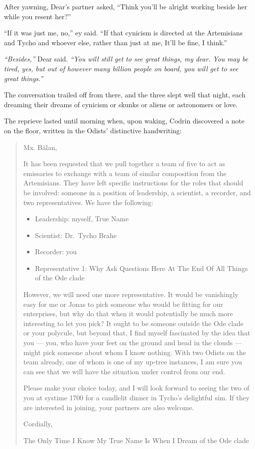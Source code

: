 After yawning, Dear's partner asked, ``Think you'll be alright working beside her while you resent her?''

``If it was just me, no,'' ey said. ``If that cynicism is directed at the Artemisians and Tycho and whoever else, rather than just at me, It'll be fine, I think.''

\emph{``Besides,''} Dear said. \emph{``You will still get to see great things, my dear. You may be tired, yes, but out of however many billion people on board, you will get to see great things.''}

The conversation trailed off from there, and the three slept well that night, each dreaming their dreams of cynicism or skunks or aliens or astronomers or love.

The reprieve lasted until morning when, upon waking, Codrin discovered a note on the floor, written in the Odists' distinctive handwriting:

\begin{quote}
Mx. Bălan,

It has been requested that we pull together a team of five to act as emissaries to exchange with a team of similar composition from the Artemisians. They have left specific instructions for the roles that should be involved: someone in a position of leadership, a scientist, a recorder, and two representatives. We have the following:

\begin{itemize}
\tightlist
\item
  Leadership: myself, True Name
\item
  Scientist: Dr.~Tycho Brahe
\item
  Recorder: you
\item
  Representative 1: Why Ask Questions Here At The End Of All Things of the Ode clade
\end{itemize}

However, we will need one more representative. It would be vanishingly easy for me or Jonas to pick someone who would be fitting for our enterprises, but why do that when it would potentially be much more interesting to let you pick? It ought to be someone outside the Ode clade or your polycule, but beyond that, I find myself fascinated by the idea that you — you, who have your feet on the ground and head in the clouds — might pick someone about whom I know nothing. With two Odists on the team already, one of whom is one of my up-tree instances, I am sure you can see that we will have the situation under control from our end.

Please make your choice today, and I will look forward to seeing the two of you at systime 1700 for a candlelit dinner in Tycho's delightful sim. If they are interested in joining, your partners are also welcome.

Cordially,

The Only Time I Know My True Name Is When I Dream of the Ode clade
\end{quote}

